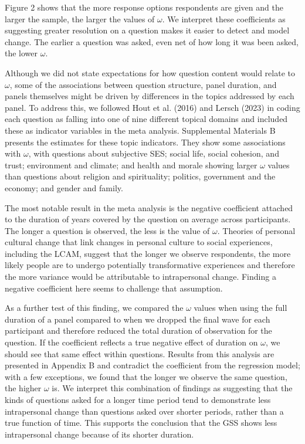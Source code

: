 \documentclass[
  12pt,
]{article}
\begin{document}
Figure 2 shows that the more response options respondents are given and
the larger the sample, the larger the values of \(\omega\). We interpret
these coefficients as suggesting greater resolution on a question makes
it easier to detect and model change. The earlier a question was asked,
even net of how long it was been asked, the lower \(\omega\).

Although we did not state expectations for how question content would
relate to \(\omega\), some of the associations between question
structure, panel duration, and panels themselves might be driven by
differences in the topics addressed by each panel. To address this, we
followed Hout et al. (2016) and Lersch (2023) in coding each question as
falling into one of nine different topical domains and included these as
indicator variables in the meta analysis. Supplemental Materials B
presents the estimates for these topic indicators. They show some
associations with \(\omega\), with questions about subjective SES;
social life, social cohesion, and trust; environment and climate; and
health and morale showing larger \(\omega\) values than questions about
religion and spirituality; politics, government and the economy; and
gender and family.

The most notable result in the meta analysis is the negative coefficient
attached to the duration of years covered by the question on average
across participants. The longer a question is observed, the less is the
value of \(\omega\). Theories of personal cultural change that link
changes in personal culture to social experiences, including the LCAM,
suggest that the longer we observe respondents, the more likely people
are to undergo potentially transformative experiences and therefore the
more variance would be attributable to intrapersonal change. Finding a
negative coefficient here seems to challenge that assumption.

As a further test of this finding, we compared the \(\omega\) values
when using the full duration of a panel compared to when we dropped the
final wave for each participant and therefore reduced the total duration
of observation for the question. If the coefficient reflects a true
negative effect of duration on \(\omega\), we should see that same
effect within questions. Results from this analysis are presented in
Appendix B and contradict the coefficient from the regression model;
with a few exceptions, we found that the longer we observe the same
question, the higher \(\omega\) is. We interpret this combination of
findings as suggesting that the kinds of questions asked for a longer
time period tend to demonstrate less intrapersonal change than questions
asked over shorter periods, rather than a true function of time. This
supports the conclusion that the GSS shows less intrapersonal change
because of its shorter duration.
\end{document}
